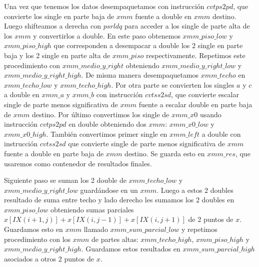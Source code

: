  Una vez que tenemos los datos desempaquetamos con instrucción $cvtps2pd$, que convierte los single
 en parte baja de $xmm$ fuente a double en $xmm$ destino. Luego shifteamos a derecha con $psrldq$ para
 acceder a los single de parte alta de los $xmm$ y convertirlos a double. En este paso obtenemos 
 $xmm\_piso\_low$ y $xmm\_piso\_high$ que corresponden a desempacar a double los 2 single en parte baja y los 
 2 single en parte alta de $xmm\_piso$ respectivamente.
Repetimos este procedimiento con $xmm\_medio\_y\_right$ obteniendo 
 $xmm\_medio\_y\_right\_low$ y $xmm\_medio\_y\_right\_high$. De misma manera desempaquetamos 
 $xmm\_techo$ en $xmm\_techo\_low$ y $xmm\_techo\_high$.
 Por otra parte se convierten los singles $a$ y $c$ a double en $xmm\_a$ y $xmm\_b$ con instrucción
 $cvtss2sd$, que convierte escalar single de parte menos significativa de $xmm$ fuente a
 escalar double en parte baja de $xmm$ destino. 
 Por último convertimos los single de $xmm\_x0$ usando instrucción $cvtps2pd$ en double obteniendo dos
 $xmm$: $xmm\_x0\_low$ y $xmm\_x0\_high$. También convertimos primer single en $xmm\_left$ a double con instrucción $cvtss2sd$ que convierte single
 de parte menos significativa de $xmm$ fuente a double en parte baja de $xmm$ destino. Se guarda esto en
 $xmm\_res$, que usaremos como contenedor de resultados finales.

Siguiente paso se suman los 2 double de $xmm\_techo\_low$ y $xmm\_medio\_y\_right\_low$ guardándose en un $ xmm$. 
Luego a estos 2 doubles resultado de suma entre techo y lado derecho les sumamos los 2 doubles
 en $xmm\_piso\_low$ obteniendo sumas parciales $x[IX(i+1,j)]+x[IX(i,j-1)]+x[IX(i,j+1)]$ de 2 puntos de $x$.
 Guardamos esto en $xmm$ llamado $xmm\_sum\_parcial\_low$ y repetimos procedimiento con los $xmm$
 de partes altas: $xmm\_techo\_high$, $xmm\_piso\_high$ y $xmm\_medio\_y\_right\_high$. Guardamos
 estos resultados en $xmm\_sum\_parcial\_high$ asociados a otros 2 puntos de $x$.

